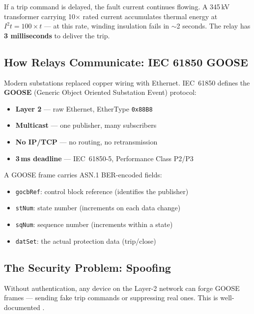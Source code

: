 \documentclass[11pt,a4paper,twocolumn]{article}
\begin{document}
\begin{keyinsight}
If a trip command is delayed, the fault current continues flowing. A 345\,kV transformer carrying 10$\times$ rated current accumulates thermal energy at $I^2 t = 100 \times t$ --- at this rate, winding insulation fails in $\sim$2 seconds. The relay has \textbf{3 milliseconds} to deliver the trip.
\end{keyinsight}

\subsection{How Relays Communicate: IEC 61850 GOOSE}

Modern substations replaced copper wiring with Ethernet. IEC~61850 defines the \textbf{GOOSE} (Generic Object Oriented Substation Event) protocol:

\begin{itemize}[leftmargin=1.5em,itemsep=1pt]
\item \textbf{Layer 2} --- raw Ethernet, EtherType \texttt{0x88B8}
\item \textbf{Multicast} --- one publisher, many subscribers
\item \textbf{No IP/TCP} --- no routing, no retransmission
\item \textbf{3\,ms deadline} --- IEC~61850-5, Performance Class P2/P3
\end{itemize}

A GOOSE frame carries ASN.1 BER-encoded fields:
\begin{itemize}[leftmargin=1.5em,itemsep=1pt]
\item \texttt{gocbRef}: control block reference (identifies the publisher)
\item \texttt{stNum}: state number (increments on each data change)
\item \texttt{sqNum}: sequence number (increments within a state)
\item \texttt{datSet}: the actual protection data (trip/close)
\end{itemize}

\subsection{The Security Problem: Spoofing}

Without authentication, any device on the Layer-2 network can forge GOOSE frames --- sending fake trip commands or suppressing real ones. This is well-documented \cite{tudelft2020, vu2021goose}.
\end{document}
